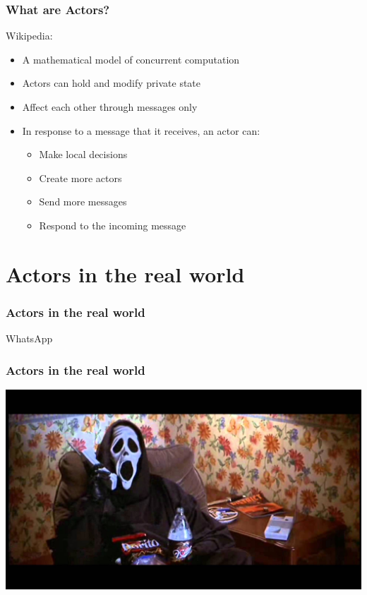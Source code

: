 \documentclass{beamer}
\begin{document}

\begin{frame}
\frametitle{What are Actors?}
Wikipedia:
\begin{itemize}[<+->]
\item A mathematical model of concurrent computation
\item Actors can hold and modify private state
\item Affect each other through messages only
\item In response to a message that it receives, an actor can:
\begin{itemize}[<+->]
\item Make local decisions
\item Create more actors
\item Send more messages
\item Respond to the incoming message
\end{itemize}
\end{itemize}
\end{frame}


\section{Actors in the real world}

\begin{frame}
\frametitle{Actors in the real world}
\Huge{\centerline{WhatsApp}}
\end{frame}



\begin{frame}
\frametitle{Actors in the real world}
\includegraphics[width=0.8\linewidth]{./images/whatsup.jpg}
\end{frame}
\end{document}

